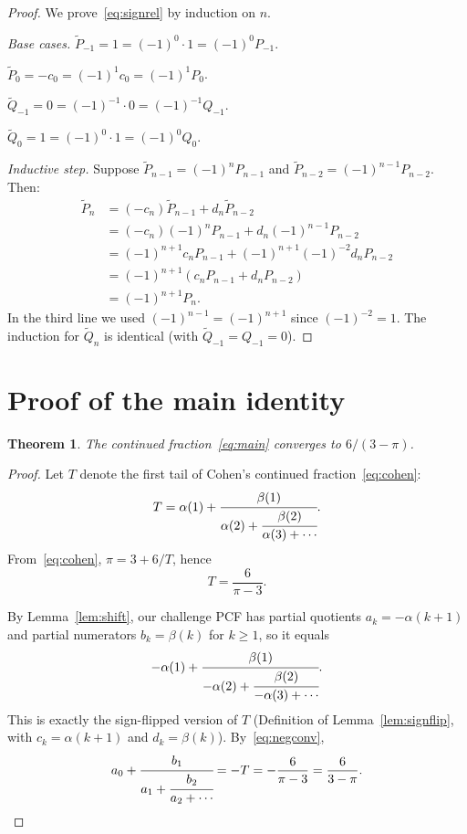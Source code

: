 \documentclass[11pt]{article}
\newtheorem{theorem}{Theorem}
\begin{document}
\begin{proof}
We prove~\eqref{eq:signrel} by induction on $n$.

\emph{Base cases.}
$\widetilde{P}_{-1} = 1 = (-1)^0 \cdot 1 = (-1)^0 P_{-1}$. \checkmark

$\widetilde{P}_0 = -c_0 = (-1)^1 c_0 = (-1)^1 P_0$. \checkmark

$\widetilde{Q}_{-1} = 0 = (-1)^{-1} \cdot 0 = (-1)^{-1} Q_{-1}$. \checkmark

$\widetilde{Q}_0 = 1 = (-1)^0 \cdot 1 = (-1)^0 Q_0$. \checkmark

\emph{Inductive step.} Suppose $\widetilde{P}_{n-1} = (-1)^n P_{n-1}$
and $\widetilde{P}_{n-2} = (-1)^{n-1} P_{n-2}$. Then:
\begin{align*}
\widetilde{P}_n &= (-c_n)\widetilde{P}_{n-1} + d_n\widetilde{P}_{n-2} \\
&= (-c_n)(-1)^n P_{n-1} + d_n (-1)^{n-1} P_{n-2} \\
&= (-1)^{n+1} c_n P_{n-1} + (-1)^{n+1}(-1)^{-2} d_n P_{n-2} \\
&= (-1)^{n+1} (c_n P_{n-1} + d_n P_{n-2}) \\
&= (-1)^{n+1} P_n.
\end{align*}
In the third line we used $(-1)^{n-1} = (-1)^{n+1}$ since
$(-1)^{-2} = 1$. The induction for $\widetilde{Q}_n$ is
identical (with $\widetilde{Q}_{-1} = Q_{-1} = 0$). \qedhere
\end{proof}

\section{Proof of the main identity}

\begin{theorem}\label{thm:main}
The continued fraction~\eqref{eq:main} converges to $6/(3-\pi)$.
\end{theorem}

\begin{proof}
Let $T$ denote the first tail of Cohen's continued
fraction~\eqref{eq:cohen}:
\[
T = \alpha(1) + \cfrac{\beta(1)}{\alpha(2) +
\cfrac{\beta(2)}{\alpha(3) + \cdots}}.
\]
From~\eqref{eq:cohen}, $\pi = 3 + 6/T$, hence
\begin{equation}\label{eq:T}
T = \frac{6}{\pi - 3}.
\end{equation}

By Lemma~\ref{lem:shift}, our challenge PCF has partial
quotients $a_k = -\alpha(k+1)$ and partial numerators
$b_k = \beta(k)$ for $k \ge 1$, so it equals
\[
-\alpha(1) + \cfrac{\beta(1)}{-\alpha(2) +
\cfrac{\beta(2)}{-\alpha(3) + \cdots}}.
\]
This is exactly the sign-flipped version of $T$
(Definition of Lemma~\ref{lem:signflip}, with $c_k = \alpha(k+1)$
and $d_k = \beta(k)$). By~\eqref{eq:negconv},
\[
a_0 + \cfrac{b_1}{a_1 + \cfrac{b_2}{a_2 + \cdots}}
= -T = -\frac{6}{\pi - 3} = \frac{6}{3 - \pi}.
\qedhere
\]
\end{proof}
\end{document}
